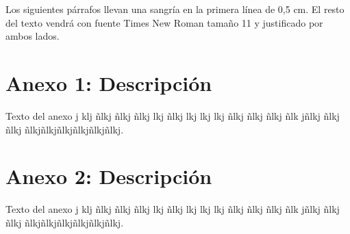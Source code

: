 \documentclass[a4paper,11pt,twocolumn,twoside]{article}
\begin{document}
Los siguientes párrafos llevan una sangría en la primera línea de
0,5 cm. El resto del texto vendrá con fuente Times New Roman
tamaño 11 y justificado por ambos lados.





\appendix
\section{Anexo 1: Descripción} Texto del anexo j klj ñlkj ñlkj ñlkj
lkj ñlkj lkj lkj lkj ñlkj ñlkj ñlkj ñlk jñlkj ñlkj ñlkj
ñlkjñlkjñlkjñlkjñlkjñlkj.

\section{Anexo 2: Descripción} Texto del anexo j klj ñlkj ñlkj ñlkj
lkj ñlkj lkj lkj lkj ñlkj ñlkj ñlkj ñlk jñlkj ñlkj ñlkj
ñlkjñlkjñlkjñlkjñlkjñlkj.
\end{document}
